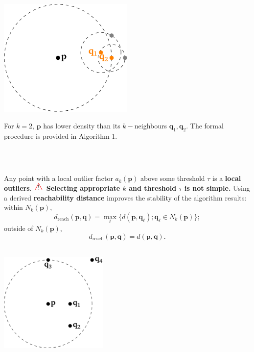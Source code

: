 \documentclass[20pt,landscape,footrule,headrule]{foils}
\newcommand{\newl}{\newline\newline}
\newcommand\Warning{%
 \makebox[1.4em][c]{%
 \makebox[0pt][c]{\raisebox{.1em}{!}}%
 \makebox[0pt][c]{\color{red}\Large$\bigtriangleup$}}}%
\begin{document}
\newpage\ \begin{center}\includegraphics[width=0.5\textwidth]{Images/Figure11}
\end{center}
{For $k=2$, $\mathbf{p}$ has lower density than its $k-$neighbours $\mathbf{q}_1,\mathbf{q}_2$. The formal procedure is provided in Algorithm 1.  
\newpage\ \begin{center}
\end{center}
\newpage\ \begin{center}
\end{center}
\newpage\ \\ \noindent Any point with a local outlier factor $a_k(\mathbf{p})$ above some threshold $\tau$ is a \textbf{local outliers}. \newl $\Warning$ \textbf{Selecting appropriate $k$ and threshold $\tau$ is not simple.} \newl Using a derived  \textbf{reachability distance} improves the stability of the algorithm results: within $N_k(\mathbf{p})$, $$d_{\text{reach}}(\mathbf{p},\mathbf{q})=\max_{\ell}\{d(\mathbf{p},\mathbf{q}_{\ell}); \mathbf{q}_{\ell}\in N_k(\mathbf{p})\};$$  outside of $N_k(\mathbf{p})$, $$d_{\text{reach}}(\mathbf{p},\mathbf{q})=d(\mathbf{p},\mathbf{q}).$$ 
\newpage\ \begin{center}\includegraphics[width=0.4\textwidth]{Images/Figure12}
\end{center}
}
\end{document}
